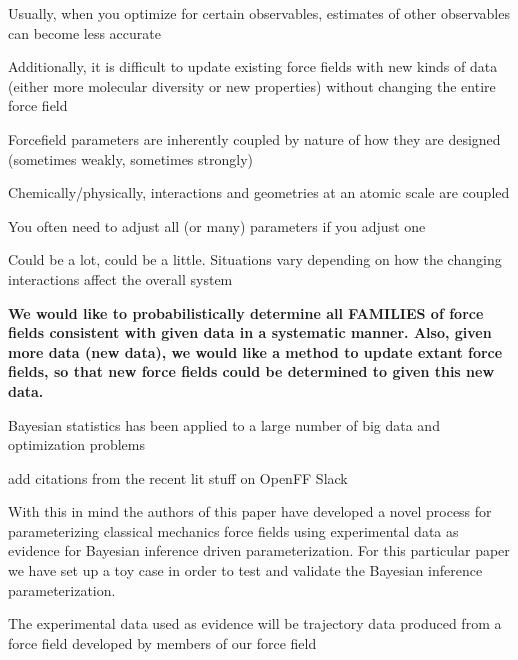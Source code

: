 \documentclass{report}
\begin{document}
\begin{outline}
\begin{outline}
{\begin{outline}
\begin{outline}
        \item{Usually, when you optimize for certain observables, estimates of other observables can become less accurate}
      \end{outline}
      \item{Additionally, it is difficult to update existing force fields with new kinds of data (either more molecular diversity or new properties) without 
            changing the entire force field}
      \begin{outline}
        \item{Forcefield parameters are inherently coupled by nature of how they are designed (sometimes weakly, sometimes strongly)}
        \item{Chemically/physically, interactions and geometries at an atomic scale are coupled}
        \item{You often need to adjust all (or many) parameters if you adjust one}
        \item{Could be a lot, could be a little. Situations vary depending on how the changing interactions affect the overall system}
      \end{outline}
      \item{\bf We would like to probabilistically determine all FAMILIES of force fields consistent with given data in a systematic manner. Also, given more 
            data (new data), we would like a method  to update extant force fields, so that new force fields could be determined to given this new data.}
    \end{outline}
    \item{Bayesian statistics has been applied to a large number of big data and optimization problems \cite{bayes1,bayes2,bayes3,bayes4,bayes5,bayes6,bayes7,
          bayes8}}
    \begin{outline}
      \item{add citations from the recent lit stuff on OpenFF Slack}
    \end{outline}
    \item{With this in mind the authors of this paper have developed a novel process for parameterizing classical mechanics force fields using experimental 
          data as evidence for Bayesian inference driven parameterization. For this particular paper we have set up a toy case in order to test and validate 
          the Bayesian inference parameterization.}
    \begin{outline}
      \item{The experimental data used as evidence will be trajectory data produced from a force field developed by members of our force field 
}
\end{outline}}
\end{outline}
\end{outline}
\end{document}
